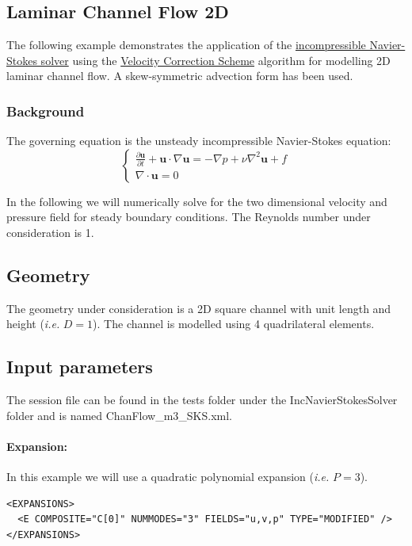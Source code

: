 \newpage

\subsection{Laminar Channel Flow 2D}
\label{LaminarChannelFlow2D}
The following example demonstrates the application of the \hyperref[IncNSsolver]{incompressible Navier-Stokes solver} using the \hyperref[VCSscheme]{Velocity Correction Scheme} algorithm for modelling 2D laminar channel flow. A skew-symmetric advection form has been used.

\subsubsection{Background}
The governing equation is the unsteady incompressible Navier-Stokes equation:
\begin{equation}
\begin{cases}
\frac{\partial \textbf{u}}{\partial t} + \textbf{u} \cdot \nabla \textbf{u} = - \nabla p + \nu \nabla^2 \textbf{u} + f \\
\nabla \cdot \textbf{u} = 0
\end{cases}
\end{equation}

In the following we will numerically solve for the two dimensional velocity and pressure field for steady boundary conditions. The Reynolds number under consideration is 1.

\subsection{Geometry}
The geometry under consideration is a 2D square channel with unit length and height (\textit{i.e.} $D=1$). The channel is modelled using 4 quadrilateral elements.

\subsection{Input parameters}
The session file can be found in the tests folder under the IncNavierStokesSolver folder and is named ChanFlow\_m3\_SKS.xml.

\paragraph{Expansion:~} In this example we will use a quadratic polynomial expansion (\textit{i.e.} $P=3$).
\begin{lstlisting}[style=XMLStyle]
<EXPANSIONS>
  <E COMPOSITE="C[0]" NUMMODES="3" FIELDS="u,v,p" TYPE="MODIFIED" />
</EXPANSIONS>
\end{lstlisting}

